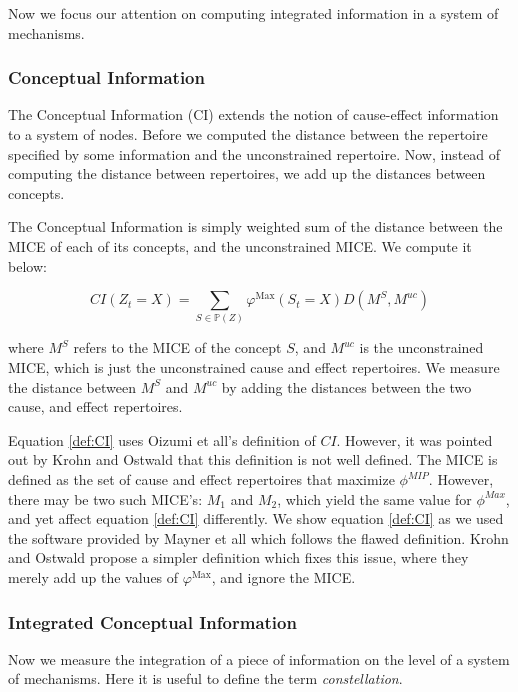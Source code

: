Now we focus our attention on computing integrated information in a system of mechanisms. 

\subsubsection{Conceptual Information}
\label{sec:CI}
The Conceptual Information (CI) extends the notion of cause-effect information to a system of nodes. Before we computed the distance between the repertoire specified by some information and the unconstrained repertoire. Now, instead of computing the distance between repertoires, we add up the distances between concepts.

The Conceptual Information is simply weighted sum of the distance between the MICE of each of its concepts, and the unconstrained MICE. We compute it below:

\begin{equation}
\label{def:CI}
CI(Z_t = X) = \sum \limits_{S \in \mathbb{P}(Z)} \varphi^{\text{Max}}(S_t=X) D(M^S, M^{uc})
\end{equation}

where $M^S$ refers to the MICE of the concept $S$, and $M^{uc}$ is the unconstrained MICE, which is just the unconstrained cause and effect repertoires. We measure the distance between $M^S$ and $M^{uc}$ by adding the distances between the two cause, and effect repertoires.

\begin{remark}
	Equation \ref{def:CI} uses Oizumi et all's \cite{oizumi2014phenomenology} definition of $CI$. However, it was pointed out by Krohn and Ostwald \cite{krohn2016computing} that this definition is not well defined. The MICE is defined as the set of cause and effect repertoires that maximize $\phi^{MIP}$. However, there may be two such MICE's: $M_1$ and $M_2$, which yield the same value for $\phi^{Max}$, and yet affect equation \ref{def:CI} differently. We show equation \ref{def:CI} as we used the software provided by Mayner et all \cite{pyphi} which follows the flawed definition. Krohn and Ostwald propose a simpler definition which fixes this issue, where they merely add up the values of $\varphi^{\text{Max}}$, and ignore the MICE.
\end{remark}

\subsubsection{Integrated Conceptual Information}
Now we measure the integration of a piece of information on the level of a system of mechanisms. Here it is useful to define the term \textit{constellation}.

